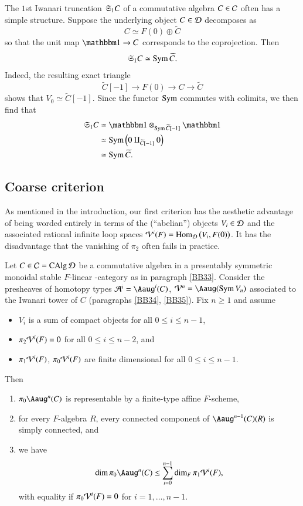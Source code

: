 \begin{ssRemark}
\label{BB36}
The $1$st Iwanari truncation $\mathfrak{S}_1C$ of a commutative algebra $C \in \mathcal{C}$ often has a simple structure. Suppose the underlying object $C \in \mathcal{D}$ decomposes as
\[
C \simeq F(0) \oplus \widetilde C
\]
so that the unit map $\one \to C$ corresponds to the coprojection. Then
\[
\mathfrak{S}_1C \simeq \operatorname{Sym} \widetilde C.
\]
Indeed, the resulting exact triangle
\[
\widetilde C[-1] \to F(0) \to C \to \widetilde C
\]
shows that $V_0 \simeq \widetilde C[-1]$. Since the functor $\operatorname{Sym}$ commutes with colimits, we then find that 
\begin{align*}
\fkS_1C  &
\simeq \one \otimes_{\Sym \widetilde C[-1]} \one
\\
& \simeq \Sym \left( 
0 \amalg_{\widetilde C[-1]} 0
\right)
\\
& \simeq \Sym \widetilde C.
\end{align*}
\end{ssRemark}

\subsection{Coarse criterion}
\label{sSec:Coarse}

As mentioned in the introduction, our first criterion has the aesthetic advantage of being worded entirely in terms of the (``abelian'') objects $V_i \in \mathcal{D}$ and the associated rational infinite loop spaces $\mathcal{V}^i(F) = \operatorname{Hom}_{\mathcal{D}} \big(V_i, F(0) \big)$. It has the disadvantage that the vanishing of $\pi_2$ often fails in practice. 

\begin{ssProposition}
\label{BB37}
Let $C \in \mathcal{C} = \operatorname{CAlg} \mathcal{D}$ be a commutative algebra in a presentably symmetric monoidal stable $F$-linear \oo-category as in paragraph \ref{BB33}. Consider the presheaves of homotopy types $\Aa^i = \Aaug^i(C)$, $\Vv^n = \Aaug(\Sym V_n)$ associated to the Iwanari tower of $C$ (paragraphs \ref{BB34}, \ref{BB35}). Fix $n \ge 1$ and assume 
\begin{itemize}
\item[(a)]
$V_i$ is a sum of compact objects for all $0 \le i \le n-1$,
\item[(b)]
$\pi_2\mathcal{V}^i(F) = 0$ for all $0 \le i \le n-2$, and
\item[(c)]
$\pi_1\mathcal{V}^i(F)$, $\pi_0\mathcal{V}^i(F)$
are finite dimensional for all $0 \le i \le n-1$.
\end{itemize}
Then 
\begin{enumerate}
\item
$\pi_0\Aaug^n(C)$ is representable by a finite-type affine $F$-scheme,
\item
for every $F$-algebra $R$, every connected component of $\Aaug^{n-1}(C)(R)$ is simply connected, and
\item
we have
\[
\dim \pi_0\Aaug^n(C) 
\le 
\sum_{i=0}^{n-1} \dim_F \pi_1 \Vv^i(F),
\]
with equality if $\pi_0 \mathcal{V}^i(F) = 0$ for $i = 1, \dots, n-1$.
\end{enumerate}
\end{ssProposition}

